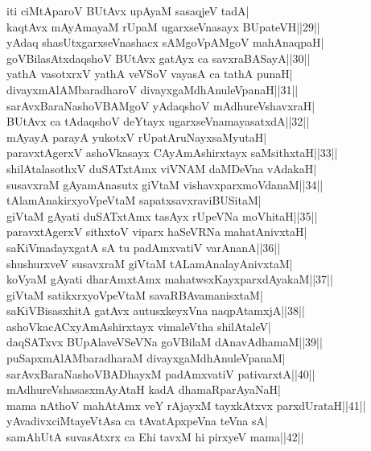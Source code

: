 \documentclass{article}
\begin{document}
iti ciMtAparoV BUtAvx upAyaM sasaqjeV tadA|\\
kaqtAvx mAyAmayaM rUpaM ugarxseVnasayx BUpateVH||29||\\
yAdaq shasUtxgarxseVnashacx sAMgoVpAMgoV mahAnaqpaH|\\
goVBilasAtxdaqshoV BUtAvx gatAyx ca savxraBASayA||30||\\
yathA vasotxrxV yathA veVSoV vayasA ca tathA punaH|\\
divayxmAlAMbaradharoV divayxgaMdhAnuleVpanaH||31||\\
sarAvxBaraNashoVBAMgoV yAdaqshoV mAdhureVshavxraH|\\
BUtAvx ca tAdaqshoV deYtayx ugarxseVnamayasatxdA||32||\\
mAyayA parayA yukotxV rUpatAruNayxsaMyutaH|\\
paravxtAgerxV ashoVkasayx CAyAmAshirxtayx saMsithxtaH||33||\\
shilAtalasothxV duSATxtAmx viVNAM daMDeVna vAdakaH|\\
susavxraM gAyamAnasutx giVtaM vishavxparxmoVdanaM||34||\\
tAlamAnakirxyoVpeVtaM sapatxsavxraviBUSitaM|\\
giVtaM gAyati duSATxtAmx tasAyx rUpeVNa moVhitaH||35||\\
paravxtAgerxV sithxtoV viparx haSeVRNa mahatAnivxtaH|\\
saKiVmadayxgatA sA tu padAmxvatiV varAnanA||36||\\
shushurxveV susavxraM giVtaM tALamAnalayAnivxtaM|\\
koVyaM gAyati dharAmxtAmx mahatwsxKayxparxdAyakaM||37||\\
giVtaM satikxrxyoVpeVtaM savaRBAvamanisxtaM|\\
saKiVBisasxhitA gatAvx autusxkeyxVna naqpAtamxjA||38||\\
ashoVkacACxyAmAshirxtayx vimaleVtha shilAtaleV|\\
daqSATxvx BUpAlaveVSeVNa goVBilaM dAnavAdhamaM||39||\\
puSapxmAlAMbaradharaM divayxgaMdhAnuleVpanaM|\\
sarAvxBaraNashoVBADhayxM padAmxvatiV pativarxtA||40||\\
mAdhureVshasasxmAyAtaH kadA dhamaRparAyaNaH|\\
mama nAthoV mahAtAmx veY rAjayxM tayxkAtxvx parxdUrataH||41||\\
yAvadivxciMtayeVtAsa ca tAvatApxpeVna teVna sA|\\
samAhUtA suvasAtxrx ca Ehi tavxM hi pirxyeV mama||42||\\
\end{document}
